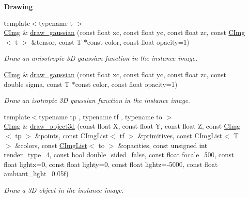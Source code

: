 \begin{Indent}{\bf Drawing}
\begin{DoxyCompactItemize}
{\footnotesize template$<$typename t $>$ }\\\hyperlink{structcimg__library_1_1_c_img}{CImg} \& \hyperlink{structcimg__library_1_1_c_img_ad04fdf43847ff838dd7e8bbbc6c35f22}{draw\_\-gaussian} (const float xc, const float yc, const float zc, const \hyperlink{structcimg__library_1_1_c_img}{CImg}$<$ t $>$ \&tensor, const T $\ast$const color, const float opacity=1)
\begin{DoxyCompactList}\small\item\em Draw an anisotropic 3D gaussian function in the instance image. \item\end{DoxyCompactList}\item 
\hyperlink{structcimg__library_1_1_c_img}{CImg} \& \hyperlink{structcimg__library_1_1_c_img_a305e6fca2fd1065b2b98298d80883c76}{draw\_\-gaussian} (const float xc, const float yc, const float zc, const double sigma, const T $\ast$const color, const float opacity=1)
\begin{DoxyCompactList}\small\item\em Draw an isotropic 3D gaussian function in the instance image. \item\end{DoxyCompactList}\item 
{\footnotesize template$<$typename tp , typename tf , typename to $>$ }\\\hyperlink{structcimg__library_1_1_c_img}{CImg} \& \hyperlink{structcimg__library_1_1_c_img_a1df1e2b2fabde887e75629eaf50ed9c3}{draw\_\-object3d} (const float X, const float Y, const float Z, const \hyperlink{structcimg__library_1_1_c_img}{CImg}$<$ tp $>$ \&points, const \hyperlink{structcimg__library_1_1_c_img_list}{CImgList}$<$ tf $>$ \&primitives, const \hyperlink{structcimg__library_1_1_c_img_list}{CImgList}$<$ T $>$ \&colors, const \hyperlink{structcimg__library_1_1_c_img_list}{CImgList}$<$ to $>$ \&opacities, const unsigned int render\_\-type=4, const bool double\_\-sided=false, const float focale=500, const float lightx=0, const float lighty=0, const float lightz=-\/5000, const float ambiant\_\-light=0.05f)
\begin{DoxyCompactList}\small\item\em Draw a 3D object in the instance image. \item\end{DoxyCompactList}\item 
\hypertarget{structcimg__library_1_1_c_img_a0770db2fa6bab28f0fe1cdb7bb397a0a}{
}
\end{DoxyCompactItemize}
\end{Indent}
